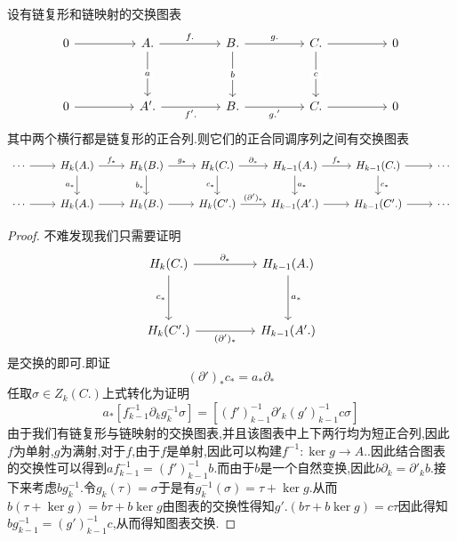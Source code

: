 \documentclass{article}
\begin{document}
\begin{theorem}
    设有链复形和链映射的交换图表
    \[\begin{tikzcd}
        0 && {A.} && {B.} && {C.} && 0 \\
        \\
        0 && {A'.} && {B.} && {C.} && 0
        \arrow[from=1-1, to=1-3]
        \arrow[from=3-1, to=3-3]
        \arrow["a"{description}, from=1-3, to=3-3]
        \arrow["{f'.}"', from=3-3, to=3-5]
        \arrow["{f.}", from=1-3, to=1-5]
        \arrow["b"{description}, from=1-5, to=3-5]
        \arrow["{g.'}"', from=3-5, to=3-7]
        \arrow["{g.}", from=1-5, to=1-7]
        \arrow["c"{description}, from=1-7, to=3-7]
        \arrow[from=1-7, to=1-9]
        \arrow[from=3-7, to=3-9]
    \end{tikzcd}\]
    其中两个横行都是链复形的正合列.则它们的正合同调序列之间有交换图表
    \[\begin{tikzcd}
        \cdots & {H_k(A.)} & {H_k(B.)} & {H_k(C.)} & {H_{k-1}(A.)} & {H_{k-1}(C.)} & \cdots \\
        \cdots & {H_k(A.)} & {H_k(B.)} & {H_k(C'.)} & {H_{k-1}(A'.)} & {H_{k-1}(C'.)} & \cdots
        \arrow["{f_*}", from=1-2, to=1-3]
        \arrow["{g_*}", from=1-3, to=1-4]
        \arrow["{\partial_*}", from=1-4, to=1-5]
        \arrow["{f_*}", from=1-5, to=1-6]
        \arrow[from=1-6, to=1-7]
        \arrow[from=1-1, to=1-2]
        \arrow["{c_*}"', from=1-4, to=2-4]
        \arrow["{(\partial')_*}", from=2-4, to=2-5]
        \arrow["{a_*}", from=1-5, to=2-5]
        \arrow[from=2-5, to=2-6]
        \arrow[from=2-6, to=2-7]
        \arrow[from=2-1, to=2-2]
        \arrow[from=2-2, to=2-3]
        \arrow[from=2-3, to=2-4]
        \arrow["{a_*}"', from=1-2, to=2-2]
        \arrow["{b_*}"', from=1-3, to=2-3]
        \arrow["{c_*}", from=1-6, to=2-6]
    \end{tikzcd}\]
\end{theorem}
\begin{proof}
    不难发现我们只需要证明
    \[\begin{tikzcd}
        {H_{k}(C.)} && {H_{k-1}(A.)} \\
        \\
        {H_k(C'.)} && {H_{k-1}(A'.)}
        \arrow["{\partial_*}", from=1-1, to=1-3]
        \arrow["{c_*}"', from=1-1, to=3-1]
        \arrow["{(\partial')_*}"', from=3-1, to=3-3]
        \arrow["{a_*}", from=1-3, to=3-3]
    \end{tikzcd}\]
    是交换的即可.即证
    $$
    (\partial')_* c_* = a_* \partial_*
    $$
    任取$\sigma \in Z_k(C.)$上式转化为证明
    $$
    a_*[f^{-1}_{k-1}\partial_kg^{-1}_k \sigma] = [(f')^{-1}_{k-1}\partial'_k(g')^{-1}_{k-1} c \sigma]
    $$
    由于我们有链复形与链映射的交换图表,并且该图表中上下两行均为短正合列,因此$f$为单射,$g$为满射,对于$f$,由于$f$是单射,因此可以构建$f^{-1}: \ker g \to A.$.因此结合图表的交换性可以得到$a f^{-1}_{k-1} = (f')^{-1}_{k-1} b$.而由于$b$是一个自然变换,因此$b \partial_k = \partial'_k b$.接下来考虑$b g^{-1}_k$.令$g_k(\tau) = \sigma$于是有$g^{-1}_k (\sigma) = \tau + \ker g$.从而$b(\tau + \ker g) = b\tau + b\ker g$由图表的交换性得知$g'. (b \tau + b \ker g) = c\tau$因此得知$bg_{k-1}^{-1} = (g')^{-1}_{k-1}c$,从而得知图表交换.
\end{proof}
\end{document}
